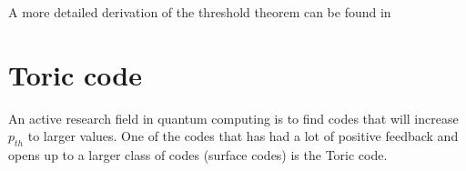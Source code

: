 A more detailed derivation of the threshold theorem can be found in \cite{DanielGottesman}













\section{Toric code}
An active research field in quantum computing is to find codes that will increase $p_{th}$ to larger values. One of the codes that has had a lot of positive feedback and opens up to a larger class of codes (surface codes) is the Toric code.

